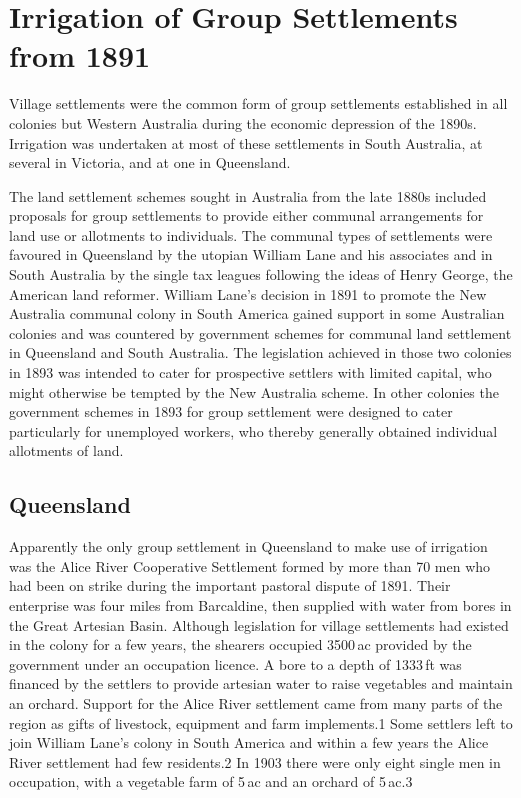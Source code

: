 
\chapter{Irrigation of Group Settlements from 1891}

Village settlements were the common form of group settlements
established in all colonies but Western Australia during the economic
depression of the 1890s.  Irrigation was undertaken at most of these
settlements in South Australia, at several in Victoria, and at one in
Queensland.

The land settlement schemes sought in Australia from the late 1880s
included proposals for group settlements to provide either communal
arrangements for land use or allotments to individuals.  The communal
types of settlements were favoured in Queensland by the utopian
William Lane and his associates and in South Australia by the single
tax leagues following the ideas of Henry George, the American land
reformer.  William Lane's decision in 1891 to promote the New
Australia communal colony in South America gained support in some
Australian colonies and was countered by government schemes for
communal land settlement in Queensland and South Australia.  The
legislation achieved in those two colonies in 1893 was intended to
cater for prospective settlers with limited capital, who might
otherwise be tempted by the New Australia scheme.  In other colonies
the government schemes in 1893 for group settlement were designed to
cater particularly for unemployed workers, who thereby generally
obtained individual allotments of land.

\section{Queensland}

Apparently the only group settlement in Queensland to make use of
irrigation was the Alice River Cooperative Settlement formed by more
than 70 men who had been on strike during the important pastoral
dispute of 1891.  Their enterprise was four miles from Barcaldine,
then supplied with water from bores in the Great Artesian Basin.
Although legislation for village settlements had existed in the colony
for a few years, the shearers occupied 3500\,ac provided by the
government under an occupation licence.  A bore to a depth of 1333\,ft
was financed by the settlers to provide artesian water to raise
vegetables and maintain an orchard.  Support for the Alice River
settlement came from many parts of the region as gifts of livestock,
equipment and farm implements.1 Some settlers left to join William
Lane's colony in South America and within a few years the Alice River
settlement had few residents.2 In 1903 there were only eight single
men in occupation, with a vegetable farm of 5\,ac and an orchard of
5\,ac.3

